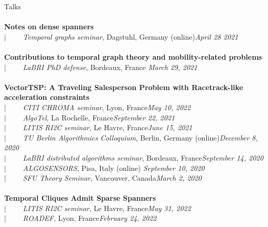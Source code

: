 \documentclass[french]{resume} %
\begin{document}
\begin{rSection}{Talks}
		\\ \\
		{\bf Notes on dense spanners} \\
		$| \qquad$ \textit{Temporal graphs seminar}, Dagstuhl, Germany (online)\hfill {\em April 28 2021} 
		\\ \\	
		{\bf Contributions to temporal graph theory and mobility-related problems} \\
		$| \qquad$ \textit{LaBRI PhD defense}, Bordeaux, France\hfill {\em 
			March 29, 2021} 
		\\ \\	
		{\bf VectorTSP: A Traveling Salesperson Problem with Racetrack-like acceleration constraints}\\
		$| \qquad$ \textit{CITI CHROMA seminar}, Lyon, France\hfill {\em May 10, 2022}\\
		$| \qquad$ \textit{AlgoTel}, La Rochelle, France\hfill {\em September 22, 2021}\\
		$| \qquad$ \textit{LITIS RI2C seminar}, Le Havre, France\hfill {\em June 15, 2021}\\
		$| \qquad$ \textit{TU Berlin Algorithmics Colloquium}, Berlin, Germany (online)\hfill {\em December 8, 2020}\\
		$| \qquad$ \textit{LaBRI distributed algorithms seminar}, Bordeaux, France\hfill {\em September 14, 2020}\\
		$| \qquad$ \textit{ALGOSENSORS}, Pisa, Italy (online) \hfill {\em September 10, 2020} \\
		$| \qquad$ \textit{SFU Theory Seminar}, Vancouver, Canada\hfill {\em March 2, 2020}
		\\ \\
		{\bf Temporal Cliques Admit Sparse Spanners} \\
		$| \qquad$ \textit{LITIS RI2C seminar}, Le Havre, France\hfill {\em May 31, 2022} \\
		$| \qquad$ \textit{ROADEF}, Lyon, France\hfill {\em February 24, 2022} \\

\end{rSection}
\end{document}
